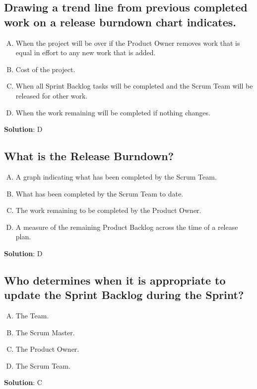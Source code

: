 \subsection{Drawing a trend line from previous completed work on a release burndown chart indicates. }
\begin{enumerate}[A)]
  \item When the project will be over if the Product Owner removes work that is equal in effort to any new work that is added.
  \item Cost of the project.
  \item When all Sprint Backlog tasks will be completed and the Scrum Team will be released for other work.
  \item When the work remaining will be completed if nothing changes.
\end{enumerate}


\textbf{Solution}: D


\subsection{What is the Release Burndown?}
\begin{enumerate}[A)]
  \item A graph indicating what has been completed by the Scrum Team.
  \item What has been completed by the Scrum Team to date.
  \item The work remaining to be completed by the Product Owner.
  \item A measure of the remaining Product Backlog across the time of a release plan.
\end{enumerate}


\textbf{Solution}: D


\subsection{Who determines when it is appropriate to update the Sprint Backlog during the Sprint?}
\begin{enumerate}[A)]
  \item The Team.
  \item The Scrum Master.
  \item The Product Owner.
  \item The Scrum Team.
\end{enumerate}


\textbf{Solution}: C


